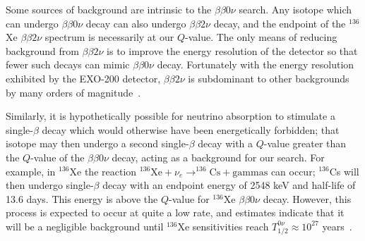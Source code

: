 Some sources of background are intrinsic to the $\beta\beta 0\nu$ search.  Any isotope which can undergo $\beta\beta 0\nu$ decay can also undergo $\beta\beta 2\nu$ decay, and the endpoint of the $^{136}$Xe $\beta\beta 2\nu$ spectrum is necessarily at our $Q$-value.  The only means of reducing background from $\beta\beta 2\nu$ is to improve the energy resolution of the detector so that fewer such decays can mimic $\beta\beta 0\nu$ decay.  Fortunately with the energy resolution exhibited by the EXO-200 detector, $\beta\beta 2\nu$ is subdominant to other backgrounds by many orders of magnitude~\cite{NewEXObb0nPaper_2014}.

Similarly, it is hypothetically possible for neutrino absorption to stimulate a single-$\beta$ decay which would otherwise have been energetically forbidden; that isotope may then undergo a second single-$\beta$ decay with a $Q$-value greater than the $Q$-value of the $\beta\beta 0\nu$ decay, acting as a background for our search.  For example, in $^{136}$Xe the reaction $^{136}\mathrm{Xe} + \nu_e \rightarrow ^{136}\mathrm{Cs} + \mathrm{gammas}$ can occur; $^{136}$Cs will then undergo single-$\beta$ decay with an endpoint energy of 2548 keV and half-life of 13.6 days.  This energy is above the $Q$-value for $^{136}$Xe $\beta\beta 0\nu$ decay.  However, this process is expected to occur at quite a low rate, and estimates indicate that it will be a negligible background until $^{136}$Xe sensitivities reach $T_{1/2}^{0\nu} \approx 10^{27}$ years~\cite{0954-3899-30-9-R01,1309.7957}.

